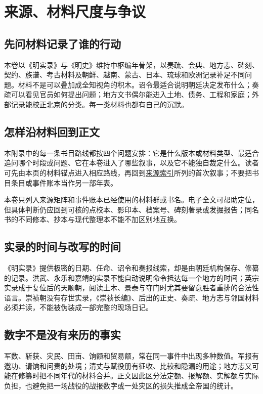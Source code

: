 \chapter{来源、材料尺度与争议}
\label{app:sources}

\section{先问材料记录了谁的行动}
\label{sources:index}

本卷以《明实录》与《明史》维持中枢编年骨架，以奏疏、会典、地方志、碑刻、契约、族谱、考古材料及朝鲜、越南、蒙古、日本、琉球和欧洲记录补足不同问题。材料不是可以叠加成全知视角的积木。诏令最适合说明朝廷决定发布什么；奏疏可以看见官员如何提出问题；地方文书偶尔能进入土地、债务、工程和家庭；外部记录能校正北京的分类。每一类材料也都有自己的沉默。

\section{怎样沿材料回到正文}

本附录中的每一条书目路线都按四个问题安排：它是什么版本或材料类型、最适合追问哪个时段或问题、它在本卷进入了哪些叙事，以及它不能独自裁定什么。读者可先由本页的材料锚点进入相应路线，再回到\hyperref[app:source-index]{来源索引}所列的首次叙事；不要把书目条目或事件账本当作另一部年表。

本卷只列入来源矩阵和事件账本已经使用的材料群或书名。电子全文可帮助定位，但具体判断仍应回到可核的点校本、影印本、档案号、碑刻著录或发掘报告；同名书的不同修本、抄本与现代整理本不能不加区别地互换。

\section{实录的时间与改写的时间}

《明实录》提供极密的日期、任命、诏令和奏报线索，却是由朝廷机构保存、修纂的记录。洪武、永乐和嘉靖的实录不能自动说明命令抵达每一个地方的时间；英宗实录成于复位后的天顺朝，阅读土木、景泰与夺门时尤其要留意胜者重排的合法性语言。崇祯朝没有存世实录，《崇祯长编》、后出的正史、奏疏、地方志与邻国材料必须并读，不能被伪装成一部完整的现场日记。

\section{数字不是没有来历的事实}

军数、斩获、灾民、田亩、饷额和贸易额，常在同一事件中出现多种数值。军报有邀功、请饷和问责的处境；清丈与赋役册有征收、比较和隐漏的用途；地方志又可能在修纂时把不同年代的材料合并。正文因此区分法定额、报解额、实解额与实际负担，也避免把一场战役的战报数字或一处灾区的损失推成全帝国的统计。

